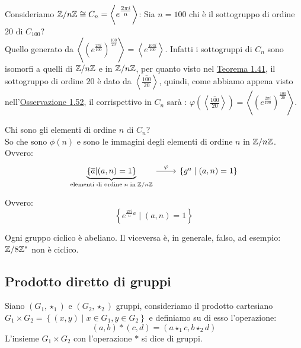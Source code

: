\documentclass[11pt]{scrartcl}
\begin{document}
\begin{example}
Consideriamo ${\mathbb Z}/n{\mathbb Z} \cong C_n = \left<e^{\textstyle\frac{2\pi i}{n}}\right>$:
Sia $n=100$ chi è il sottogruppo di ordine $20$ di $C_{100}$? \\
		Quello generato da $\left<\left(e^{\textstyle\frac{2\pi i}{100}} \right)^{\frac{100}{20}}\right> = \left<e^{\textstyle\frac{10\pi i}{100}}\right>$. Infatti i sottogruppi di $C_n$ sono isomorfi a quelli di ${\mathbb Z}/n{\mathbb Z}$ e in ${\mathbb Z}/n{\mathbb Z}$, per quanto visto nel \hyperref[g:sottogZn]{Teorema 1.41}, il sottogruppo di ordine $20$ è dato da $\left<\overline{\frac{100}{20}}\right>$, quindi, come abbiamo appena visto nell'\hyperref[g:Sappiamo_Tutto]{Osservazione 1.52}, il corrispettivo in $C_n$ sarà : $\varphi\left(\left<\overline{\frac{100}{20}}\right>\right) = \left<\left(e^{\textstyle\frac{2\pi i}{100}} \right)^{\frac{100}{20}}\right>$.
\end{example}

\begin{example}
Chi sono gli elementi di ordine $n$ di $C_n$? \\
		So che sono $\phi(n)$ e sono le immagini degli elementi di ordine $n$ in ${\mathbb Z}/n{\mathbb Z}$. Ovvero:
			\[  \begin{tikzcd}\underbrace{\left\{\overline{a} | (a,n) = 1\right\}}_{\text{elementi di ordine}\; n \; \text{in} \; \Zn}  \ar[r, "\varphi"' above] &\left\{g^a \mid (a,n)=1\right\}
			\end{tikzcd}\]
Ovvero:
		\[ \left\{e^{\textstyle\frac{2 \pi i}{n}a} \; \bigg\vert \; (a,n)=1\right\}
		\]
\end{example}

\begin{remark}
[Ovvia]
Ogni gruppo ciclico è abeliano. Il viceversa è, in generale, falso, ad esempio: $\mathbb Z/8\mathbb Z^*$ non è ciclico.
\end{remark}


\newpage
\subsection{Prodotto diretto di gruppi}
\begin{definition}
Siano $(G_1, \star_1)$ e $(G_2, \star_2)$ gruppi, consideriamo il prodotto cartesiano $G_1 \times G_2 = \left\{(x, y) \mid x \in G_1, y \in G_2 \right\}$ e definiamo su di esso l'operazione:
	\[ (a,b) \ast (c,d)
	=
	(a \star_1 c, b \star_2 d)
	\]
L'insieme $G_1 \times G_2$ con l'operazione $\ast$ si dice  di gruppi.
\end{definition}
\end{document}
